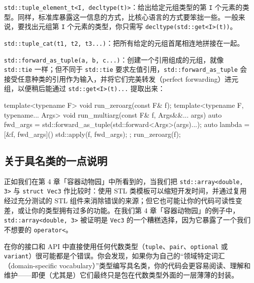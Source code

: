 \texttt{std::\allowbreak{}tuple\_\allowbreak{}element\_\allowbreak{}t<\allowbreak{}I,\allowbreak{} decltype(\allowbreak{}t)\allowbreak{}>}：给出给定元组类型的第 \texttt{I} 个元素的类型。同样，标准库暴露这一信息的方式，比核心语言的方式要笨拙一些。一般来说，要找出元组第 \texttt{I} 个元素的类型，你只需写 \texttt{decltype(\allowbreak{}std::\allowbreak{}get<\allowbreak{}I>\allowbreak{}(\allowbreak{}t)\allowbreak{})\allowbreak{}}。

\texttt{std::\allowbreak{}tuple\_\allowbreak{}cat(\allowbreak{}t1,\allowbreak{} t2,\allowbreak{} t3...)\allowbreak{}}：把所有给定的元组首尾相连地拼接在一起。

\texttt{std::\allowbreak{}forward\_\allowbreak{}as\_\allowbreak{}tuple(\allowbreak{}a,\allowbreak{} b,\allowbreak{} c...)\allowbreak{}}：创建一个引用组成的元组，就像 \texttt{std::\allowbreak{}tie} 一样；但不同于 \texttt{std::\allowbreak{}tie} 要求左值引用，\texttt{std::\allowbreak{}forward\_\allowbreak{}as\_\allowbreak{}tuple} 会接受任意种类的引用作为输入，并将它们完美转发（perfect forwarding）进元组，以便稍后能通过 \texttt{std::\allowbreak{}get<\allowbreak{}I>\allowbreak{}(\allowbreak{}t)\allowbreak{}...} 提取出来：

\begin{codebox}[cpp]
        template<typename F>
        void run_zeroarg(const F& f);
        template<typename F, typename... Args>
        void run_multiarg(const F& f, Args&&... args)
        {
          auto fwd_args =
            std::forward_as_tuple(std::forward<Args>(args)...);
          auto lambda = [&f, fwd_args]() {
            std::apply(f, fwd_args);
          };
          run_zeroarg(f);
        }
\end{codebox}

\subsection{关于具名类的一点说明}

正如我们在第 4 章「容器动物园」中所看到的，当我们把 \texttt{std::\allowbreak{}array<\allowbreak{}double,\allowbreak{} 3>\allowbreak{}} 与 \texttt{struct Vec3} 作比较时：使用 STL 类模板可以缩短开发时间，并通过复用经过充分测试的 STL 组件来消除错误的来源；但它也可能让你的代码可读性变差，或让你的类型拥有过多的功能。在我们第 4 章「容器动物园」的例子中，\texttt{std::\allowbreak{}array<\allowbreak{}double,\allowbreak{} 3>\allowbreak{}} 被证明是 \texttt{Vec3} 的一个糟糕选择，因为它暴露了一个我们不想要的 \texttt{operator<}。

在你的接口和 API 中直接使用任何代数类型（\texttt{tuple}、\texttt{pair}、\texttt{optional} 或 \texttt{variant}）很可能都是个错误。你会发现，如果你为自己的“领域特定词汇（domain-specific vocabulary）”类型编写具名类，你的代码会更容易阅读、理解和维护——即便（尤其是）它们最终只是包在代数类型外面的一层薄薄的封装。

